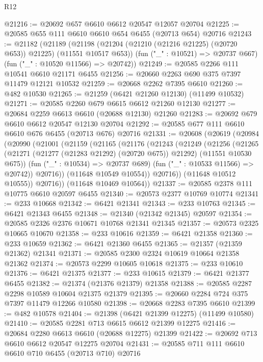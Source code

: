 \begin{lexlean}{R12}
\begin{coremodule}
@21216 := @20692 @657 @6610 @6612 @20547 @12057 @20704
@21225 := @20585 @655 @111 @6610 @6610 @654 @6455 (@20713 @654) @20716
@21243 := @21182
    (@21189
      (@21198 (@21204 (@21210 (@21216 @21225) (@20720 @653)) @21225) (@11551 @10517 @653))
      (fun ("_" : @10521) => @20737 @667)
      (fun ("_" : @10520 @11566) => @20742))
@21249 := @20585 @2266 @111 @10541 @6610 @21171 @6455
@21256 := @20660 @2263 @690 @375 @7397 @11479 @12121 @10532
@21259 := @20668 @2262 @7395 @6610
@21260 := @482 @10530
@21265 := @21259 (@6421 @21260 @12130) (@11499 @10532)
@21271 := @20585 @2260 @679 @6615 @6612 @21260 @12130
@21277 := @20684 @2259 @6613 @6610 (@20688 @12130) @21260
@21283 := @20692 @679 @6610 @6612 @20547 @12130 @20704
@21292 := @20585 @677 @111 @6610 @6610 @676 @6455 (@20713 @676) @20716
@21331 := @20608
    (@20619
      (@20984
        (@20990
          (@21001
            (@21159
              (@21165
                (@21176
                  (@21243
                    (@21249
                      (@21256
                        (@21265
                          (@21271 (@21277 (@21283 @21292) (@20720 @675)) @21292)
                          (@11551 @10530 @675))
                        (fun ("_" : @10534) => @20737 @689)
                        (fun ("_" : @10533 @11566) => @20742))
                      @20716))
                  (@11648 @10549 @10554))
                @20716))
            (@11648 @10512 @10555))
          @20716))
      (@11648 @10469 @10564))
@21337 := @20585 @2378 @111 @10775 @6610 @20597 @6455
@21340 := @20573 @2377 @10769 @10774
@21341 := @233 @10668
@21342 := @6421 @21341
@21343 := @233 @10763
@21345 := @6421 @21343 @6455
@21348 := @21340 (@21342 @21345) @20597
@21354 := @20585 @2326 @2376 @10671 @10768 @21341 @21345
@21357 := @20573 @2325 @10665 @10670
@21358 := @233 @10616
@21359 := @6421 @21358
@21360 := @233 @10659
@21362 := @6421 @21360 @6455
@21365 := @21357 (@21359 @21362) @21341
@21371 := @20585 @2300 @2324 @10619 @10664 @21358 @21362
@21374 := @20573 @2299 @10605 @10618
@21375 := @233 @10610
@21376 := @6421 @21375
@21377 := @233 @10615
@21379 := @6421 @21377 @6455
@21382 := @21374 (@21376 @21379) @21358
@21388 := @20585 @2287 @2298 @10589 @10604 @21375 @21379
@21395 := @20660 @2284 @724 @375 @7397 @11479 @12266 @10580
@21398 := @20668 @2283 @7395 @6610
@21399 := @482 @10578
@21404 := @21398 (@6421 @21399 @12275) (@11499 @10580)
@21410 := @20585 @2281 @713 @6615 @6612 @21399 @12275
@21416 := @20684 @2280 @6613 @6610 (@20688 @12275) @21399
@21422 := @20692 @713 @6610 @6612 @20547 @12275 @20704
@21431 := @20585 @711 @111 @6610 @6610 @710 @6455 (@20713 @710) @20716

\end{coremodule}
\end{lexlean}
